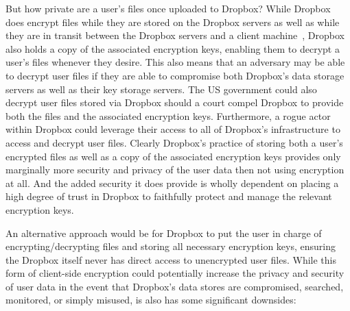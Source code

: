 But how private are a user's files once uploaded to Dropbox? While
Dropbox does encrypt files while they are stored on the Dropbox
servers as well as while they are in transit between the Dropbox
servers and a client machine~\cite{dropbox-security}, Dropbox also
holds a copy of the associated encryption keys, enabling them to
decrypt a user's files whenever they desire. This also means that an
adversary may be able to decrypt user files if they are able to
compromise both Dropbox's data storage servers as well as their key
storage servers. The US government could also decrypt user files
stored via Dropbox should a court compel Dropbox to provide both the
files and the associated encryption keys. Furthermore, a rogue actor
within Dropbox could leverage their access to all of Dropbox's
infrastructure to access and decrypt user files. Clearly Dropbox's
practice of storing both a user's encrypted files as well as a copy of
the associated encryption keys provides only marginally more security
and privacy of the user data then not using encryption at all. And the
added security it does provide is wholly dependent on placing a high
degree of trust in Dropbox to faithfully protect and manage the
relevant encryption keys.

An alternative approach would be for Dropbox to put the user in charge
of encrypting/decrypting files and storing all necessary encryption
keys, ensuring the Dropbox itself never has direct access to
unencrypted user files. While this form of client-side encryption
could potentially increase the privacy and security of user data in
the event that Dropbox's data stores are compromised, searched,
monitored, or simply misused, is also has some significant downsides:

